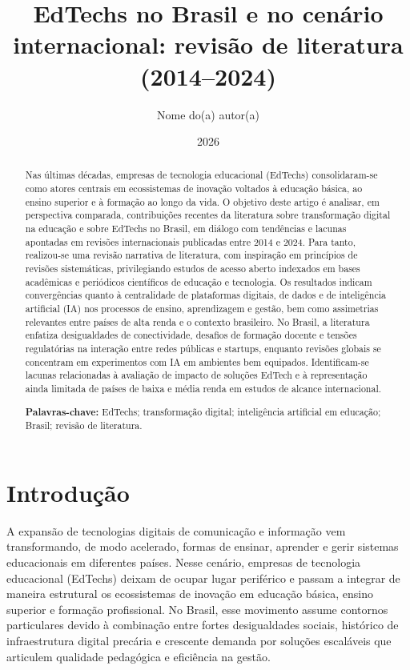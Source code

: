 \documentclass[12pt]{article}
\title{EdTechs no Brasil e no cen\'ario internacional: revis\~ao de literatura (2014--2024)}
\author{Nome do(a) autor(a)}
\date{2026}
\begin{document}
\maketitle

\begin{abstract}
Nas \'ultimas d\'ecadas, empresas de tecnologia educacional (EdTechs) consolidaram-se como atores centrais em ecossistemas de inova\c{c}\~ao voltados \`a educa\c{c}\~ao b\'asica, ao ensino superior e \`a forma\c{c}\~ao ao longo da vida. O objetivo deste artigo \'e analisar, em perspectiva comparada, contribui\c{c}\~oes recentes da literatura sobre transforma\c{c}\~ao digital na educa\c{c}\~ao e sobre EdTechs no Brasil, em di\'alogo com tend\^encias e lacunas apontadas em revis\~oes internacionais publicadas entre 2014 e 2024. Para tanto, realizou-se uma revis\~ao narrativa de literatura, com inspira\c{c}\~ao em princ\'ipios de revis\~oes sistem\'aticas, privilegiando estudos de acesso aberto indexados em bases acad\^emicas e peri\'odicos cient\'ificos de educa\c{c}\~ao e tecnologia. Os resultados indicam converg\^encias quanto \`a centralidade de plataformas digitais, de dados e de intelig\^encia artificial (IA) nos processos de ensino, aprendizagem e gest\~ao, bem como assimetrias relevantes entre pa\'ises de alta renda e o contexto brasileiro. No Brasil, a literatura enfatiza desigualdades de conectividade, desafios de forma\c{c}\~ao docente e tens\~oes regulat\'orias na intera\c{c}\~ao entre redes p\'ublicas e startups, enquanto revis\~oes globais se concentram em experimentos com IA em ambientes bem equipados. Identificam-se lacunas relacionadas \`a avalia\c{c}\~ao de impacto de solu\c{c}\~oes EdTech e \`a representa\c{c}\~ao ainda limitada de pa\'ises de baixa e m\'edia renda em estudos de alcance internacional.

\textbf{Palavras-chave:} EdTechs; transforma\c{c}\~ao digital; intelig\^encia artificial em educa\c{c}\~ao; Brasil; revis\~ao de literatura.
\end{abstract}

\section{Introdu\c{c}\~ao}

A expans\~ao de tecnologias digitais de comunica\c{c}\~ao e informa\c{c}\~ao vem transformando, de modo acelerado, formas de ensinar, aprender e gerir sistemas educacionais em diferentes pa\'ises. Nesse cen\'ario, empresas de tecnologia educacional (EdTechs) deixam de ocupar lugar perif\'erico e passam a integrar de maneira estrutural os ecossistemas de inova\c{c}\~ao em educa\c{c}\~ao b\'asica, ensino superior e forma\c{c}\~ao profissional. No Brasil, esse movimento assume contornos particulares devido \`a combina\c{c}\~ao entre fortes desigualdades sociais, hist\'orico de infraestrutura digital prec\'aria e crescente demanda por solu\c{c}\~oes escal\'aveis que articulem qualidade pedag\'ogica e efici\^encia na gest\~ao.
\end{document}
